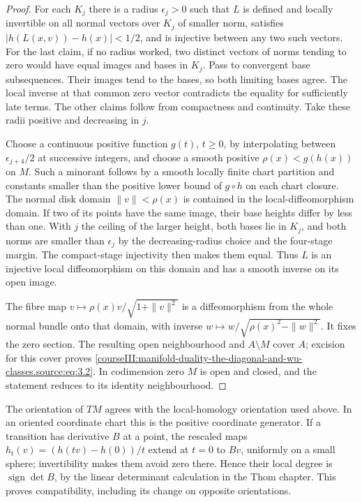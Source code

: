 \begin{proof}
For each \(K_j\) there is a radius \(\epsilon_j>0\) such that \(L\) is defined and locally invertible on all normal vectors over \(K_j\) of smaller norm, satisfies \(|h(L(x,v))-h(x)|<1/2\), and is injective between any two such vectors. For the last claim, if no radius worked, two distinct vectors of norms tending to zero would have equal images and bases in \(K_j\). Pass to convergent base subsequences. Their images tend to the bases, so both limiting bases agree. The local inverse at that common zero vector contradicts the equality for sufficiently late terms. The other claims follow from compactness and continuity. Take these radii positive and decreasing in \(j\).

Choose a continuous positive function \(g(t)\), \(t\geq0\), by interpolating between \(\epsilon_{j+4}/2\) at successive integers, and choose a smooth positive \(\rho(x)<g(h(x))\) on \(M\). Such a minorant follows by a smooth locally finite chart partition and constants smaller than the positive lower bound of \(g\circ h\) on each chart closure. The normal disk domain \(\|v\|<\rho(x)\) is contained in the local-diffeomorphism domain. If two of its points have the same image, their base heights differ by less than one. With \(j\) the ceiling of the larger height, both bases lie in \(K_j\), and both norms are smaller than \(\epsilon_j\) by the decreasing-radius choice and the four-stage margin. The compact-stage injectivity then makes them equal. Thus \(L\) is an injective local diffeomorphism on this domain and has a smooth inverse on its open image.

The fibre map \(v\mapsto\rho(x)v/\sqrt{1+\|v\|^2}\) is a diffeomorphism from the whole normal bundle onto that domain, with inverse \(w\mapsto w/\sqrt{\rho(x)^2-\|w\|^2}\). It fixes the zero section. The resulting open neighbourhood and \(A\setminus M\) cover \(A\); excision for this cover proves \eqref{courseIII:manifold-duality-the-diagonal-and-wu-classes.source:eq:3.2}. In codimension zero \(M\) is open and closed, and the statement reduces to its identity neighbourhood.
\end{proof}

The orientation of \(TM\) agrees with the local-homology orientation used above. In an oriented coordinate chart this is the positive coordinate generator. If a transition has derivative \(B\) at a point, the rescaled maps \(h_t(v)=(h(tv)-h(0))/t\) extend at \(t=0\) to \(Bv\), uniformly on a small sphere; invertibility makes them avoid zero there. Hence their local degree is \(\operatorname{sign}\det B\), by the linear determinant calculation in the Thom chapter. This proves compatibility, including its change on opposite orientations.

